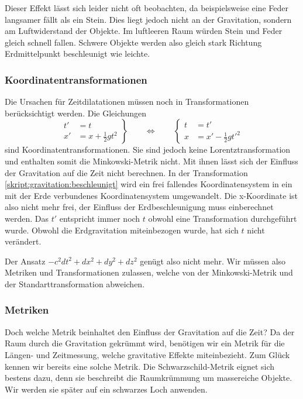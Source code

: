 \begin{refsection}
	Dieser Effekt lässt sich leider nicht oft beobachten, da beispielsweise eine Feder langsamer fällt als ein Stein. Dies liegt jedoch nicht an der Gravitation, sondern am Luftwiderstand der Objekte. Im luftleeren Raum würden Stein und Feder gleich schnell fallen. Schwere Objekte werden also gleich stark Richtung Erdmittelpunkt beschleunigt wie leichte.
	
	\subsubsection{Koordinatentransformationen}
    Die Ursachen für Zeitdilatationen müssen noch in Transformationen berücksichtigt werden. 
	Die Gleichungen 
	\begin{equation}\label{skript:gravitation:beschleunigt}
	\left.
	\begin{aligned}
	t'&=t\\
	x'&=x+\frac12gt^2
	\end{aligned}
	\right\}
	\qquad
	\Leftrightarrow
	\qquad
	\left\{
	\begin{aligned}
	t&=t'\\
	x&=x'-\frac12gt'^2
	\end{aligned}
	\right.
	\end{equation}
    sind Koordinatentransformationen. Sie sind jedoch keine Lorentztransformation und enthalten somit die Minkowski-Metrik nicht. Mit ihnen lässt sich der Einfluss der Gravitation auf die Zeit nicht berechnen. 
    In der Transformation \ref{skript:gravitation:beschleunigt} wird ein frei fallendes Koordinatensystem in ein mit der Erde verbundenes Koordinatensystem umgewandelt. Die x-Koordinate ist also nicht mehr frei, der Einfluss der Erdbeschleunigung muss einberechnet werden.
	Das $t'$ entspricht immer noch $t$ obwohl eine Transformation durchgeführt wurde. Obwohl die Erdgravitation miteinbezogen wurde, hat sich $t$ nicht verändert.
	
	Der Ansatz $ -c^2dt^2 + dx^2 + dy^2 + dz^2$ genügt also nicht mehr. Wir müssen also Metriken und Transformationen zulassen, welche von der Minkowski-Metrik und der Standarttransformation abweichen.
	
	\subsubsection{Metriken}\label{skript:chapter:zeitreisen:metriken}
	Doch welche Metrik beinhaltet den Einfluss der Gravitation auf die Zeit? 
	Da der Raum durch die Gravitation gekrümmt wird, benötigen wir ein Metrik für die Längen- und Zeitmessung, welche gravitative Effekte miteinbezieht.
	Zum Glück kennen wir bereits eine solche Metrik. Die Schwarzschild-Metrik eignet sich bestens dazu, denn sie beschreibt die Raumkrümmung um massereiche Objekte. Wir werden sie später auf ein schwarzes Loch anwenden. 


\end{refsection}
